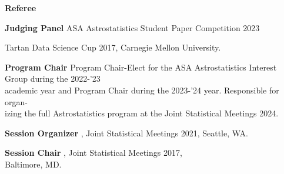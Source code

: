 \documentclass[letterpaper,10pt]{extarticle}
\begin{document}
\begin{addmargin}[0.25cm]{2ex}

{\bf Referee}
\hspace{13.5ex}{\it Astronomy and Computing (A\&C)} 

\vspace{0.15cm}

\hspace{23ex}{\it Journal of Cosmology and Astroparticle Physics (JCAP)} 

\vspace{0.15cm}

\hspace{23ex}{\it NASA Experimental Program to Stimulate Competitive Research (EPSCoR)} 

\vspace{0.15cm}

\hspace{23ex}{\it CHANCE Magazine}


\vspace{.4cm}

{\bf Judging Panel}
\indent\hspace{5.35ex}ASA Astrostatistics Student Paper Competition 2023 

\vspace{0.15cm}

\hspace{22.75ex}Tartan Data Science Cup 2017, Carnegie Mellon University.

\vspace{.4cm}


{\bf Program Chair}
\indent\hspace{4.9ex}Program Chair-Elect for the ASA Astrostatistics Interest Group during the 2022-'23\\
\indent\hspace{23ex}academic year and Program Chair during the 2023-'24 year. Responsible for organ-\\
\indent\hspace{23ex}izing the full Astrostatistics program at the Joint Statistical Meetings 2024.

\vspace{.4cm}

{\bf Session Organizer}
\indent\hspace{1.35ex}{\it Statistical Challenges in Cosmology}, Joint Statistical Meetings 2021, Seattle, WA.

\vspace{.4cm}

{\bf Session Chair}
\indent\hspace{6.1ex}{\it Computing, Graphics, and Programming Statistics}, Joint Statistical Meetings 2017,\\
\indent\hspace{23ex}Baltimore, MD.

\end{addmargin}
\end{document}
